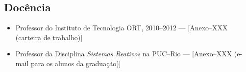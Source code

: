 \documentclass[12pt,a4paper]{article}
\begin{document}
\subsection*{Docência}

\begin{itemize}
\item
Professor do Instituto de Tecnologia ORT, 2010--2012
--- [Anexo--XXX (carteira de trabalho)]
\item
Professor da Disciplina \emph{Sistemas Reativos} na PUC--Rio
--- [Anexo--XXX (e-mail para os alunos da graduação)]
\end{itemize}


\newpage


\end{document}
